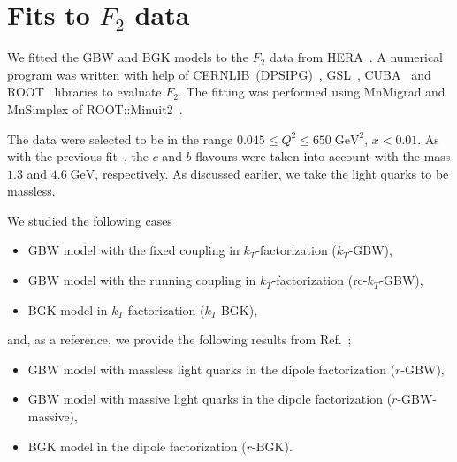 \documentclass[11pt]{article}
\begin{document}
\section{Fits to $F_2$ data}
\label{sec:F2fits}

We fitted the GBW and BGK models to the $F_2$ data from
HERA~\cite{Abt:2017nkc}. A numerical program was written with help of
CERNLIB~(DPSIPG)~\cite{Kolbig:1972zz}, GSL~\cite{GSL}, CUBA~\cite{Hahn:2004fe}
and ROOT~\cite{Brun:1997pa} libraries to evaluate $F_2$. The fitting was
performed using MnMigrad and MnSimplex of ROOT::Minuit2~\cite{James:2004xla}.

The data were selected to be in the range $0.045\leq Q^2\leq
650\;\mathrm{GeV^2}$, $x<0.01$.  As with the previous fit~\cite{Goda:2022wsc},
the $c$ and $b$ flavours were taken into account with the mass $1.3$ and
$4.6\;\mathrm{GeV}$, respectively. As discussed earlier, we take the light
quarks to be massless.  

We studied the following cases
%
\begin{itemize}
\item GBW model with the fixed coupling in $k_T$-factorization  ($k_T$-GBW),
\item GBW model with the running coupling in $k_T$-factorization (rc-$k_T$-GBW),
\item BGK model in $k_T$-factorization ($k_T$-BGK),
\end{itemize} 
%
and, as a reference, we provide the following results from
Ref.~\cite{Goda:2022wsc};
%
\begin{itemize}
\item GBW model with massless light quarks in the dipole factorization ($r$-GBW),
\item GBW model with massive light quarks in the dipole factorization ($r$-GBW-massive),
\item  BGK model in  the dipole factorization ($r$-BGK).
\end{itemize} 
\end{document}
